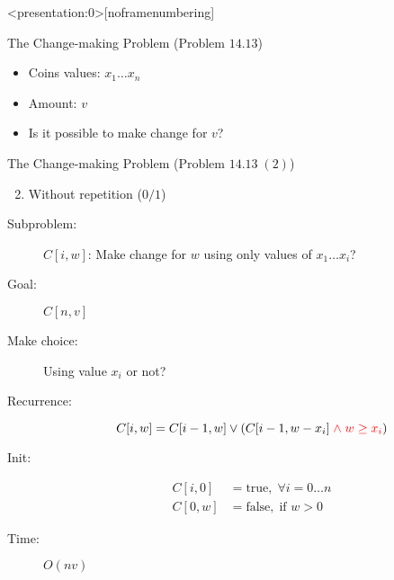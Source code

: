 
\begin{frame}<presentation:0>[noframenumbering]
  \centerline{}
\end{frame}

\begin{frame}{}
  \begin{exampleblock}{The Change-making Problem (Problem $14.13$)}
    \begin{itemize}
      \item Coins values: $x_{1} \dots x_{n}$
      \item Amount: $v$
      \item Is it possible to make change for $v$?
    \end{itemize}
  \end{exampleblock}
\end{frame}
\begin{frame}{}
  \begin{exampleblock}{The Change-making Problem (Problem $14.13\; (2)$)}
    \begin{enumerate}[(1)]
      \setcounter{enumi}{1}
      \item Without repetition ($0/1$)
    \end{enumerate}
  \end{exampleblock}

  \pause
  \begin{description}
    \item[Subproblem:] $C[i, w]$: Make change for $w$ using only values of $x_{1} \dots x_{i}$?
    \item[Goal:] $C[n,v]$
      \pause
    \item[Make choice:] Using value $x_{i}$ or not?
    \item[Recurrence:] 
      \[
	C[i,w] = C[i-1, w] \lor (C[i-1, w-x_{i}] \textcolor{red}{\;\land\; w \ge x_{i}})
      \]
      \pause
    \item[Init:]
      \begin{align*}
		C[i,0] &= \text{true},  \; \forall i = 0 \dots n  \\
		C[0,w] &= \text{false}, \;\text{if } w > 0
      \end{align*}
    \item[Time:] $O(nv)$
  \end{description}
\end{frame}
